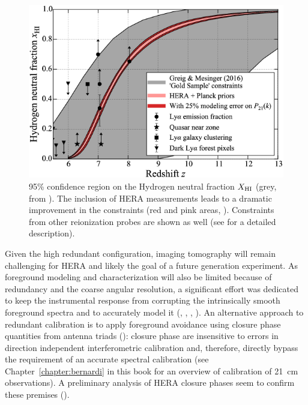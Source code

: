 \begin{figure}[]
\begin{center}
\includegraphics[width=1.\textwidth]{Koopmans_Bernardi/hera_ion_hist}
\end{center}
\caption{95\% confidence region on the Hydrogen neutral fraction $X_{\rm HI}$ (grey, from \cite{greig17}). The inclusion of HERA measurements leads to a dramatic improvement in the constraints (red and pink areas, \cite{liu16b}). Constraints from other reionization probes are shown as well (see \cite{deboer17} for a detailed description).}
\label{fig:fig_hera_ion_hist}
\end{figure}

Given the high redundant configuration, imaging tomography will remain challenging for HERA and likely the goal of a future generation experiment. As foreground modeling and characterization will also be limited because of redundancy and the coarse angular resolution, a significant effort was dedicated to keep the instrumental response from corrupting the intrinsically smooth foreground spectra and to accurately model it (\cite{neben16}, \cite{ewallwice16}, \cite{thyagarajan16}, \cite{patra18}). An alternative approach to redundant calibration is to apply foreground avoidance using closure phase quantities from antenna triads (\cite{thyagarajan18}): closure phase are insensitive to errors in direction independent interferometric calibration and, therefore, directly bypass the requirement of an accurate spectral calibration (see Chapter~\ref{chapter:bernardi} in this book for an overview of calibration of 21~cm observations). A preliminary analysis of HERA closure phases seem to confirm these premises (\cite{carilli18}).


